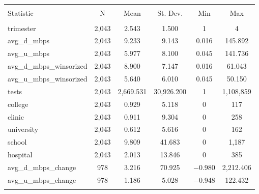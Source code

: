 
\begin{table}[!htbp] \centering 
  \caption{} 
  \label{} 
\begin{tabular}{@{\extracolsep{5pt}}lccccc} 
\\[-1.8ex]\hline 
\hline \\[-1.8ex] 
Statistic & \multicolumn{1}{c}{N} & \multicolumn{1}{c}{Mean} & \multicolumn{1}{c}{St. Dev.} & \multicolumn{1}{c}{Min} & \multicolumn{1}{c}{Max} \\ 
\hline \\[-1.8ex] 
trimester & 2,043 & 2.543 & 1.500 & 1 & 4 \\ 
avg\_d\_mbps & 2,043 & 9.233 & 9.143 & 0.016 & 145.892 \\ 
avg\_u\_mbps & 2,043 & 5.977 & 8.100 & 0.045 & 141.736 \\ 
avg\_d\_mbps\_winsorized & 2,043 & 8.900 & 7.147 & 0.016 & 61.043 \\ 
avg\_u\_mbps\_winsorized & 2,043 & 5.640 & 6.010 & 0.045 & 50.150 \\ 
tests & 2,043 & 2,669.531 & 30,926.200 & 1 & 1,108,859 \\ 
college & 2,043 & 0.929 & 5.118 & 0 & 117 \\ 
clinic & 2,043 & 0.911 & 9.304 & 0 & 258 \\ 
university & 2,043 & 0.612 & 5.616 & 0 & 162 \\ 
school & 2,043 & 9.809 & 41.683 & 0 & 1,187 \\ 
hospital & 2,043 & 2.013 & 13.846 & 0 & 385 \\ 
avg\_d\_mbps\_change & 978 & 3.216 & 70.925 & $-$0.980 & 2,212.406 \\ 
avg\_u\_mbps\_change & 978 & 1.186 & 5.028 & $-$0.948 & 122.432 \\ 
\hline \\[-1.8ex] 
\end{tabular} 
\end{table} 
